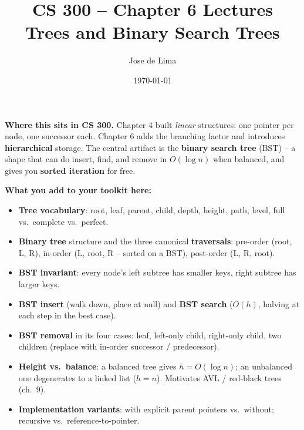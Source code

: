 \documentclass[11pt]{article}
\title{CS 300 -- Chapter 6 Lectures\\\large Trees and Binary Search Trees}
\author{Jose de Lima}
\date{\today}
\begin{document}
\maketitle

\begin{ideabox}
\textbf{Where this sits in CS 300.} Chapter 4 built \emph{linear}
structures: one pointer per node, one successor each. Chapter 6 adds the
branching factor and introduces \textbf{hierarchical} storage. The
central artifact is the \textbf{binary search tree} (BST) -- a shape
that can do insert, find, and remove in $O(\log n)$ when balanced, and
gives you \textbf{sorted iteration} for free.

\textbf{What you add to your toolkit here:}
\begin{itemize}
    \item \textbf{Tree vocabulary}: root, leaf, parent, child, depth,
          height, path, level, full vs.\ complete vs.\ perfect.
    \item \textbf{Binary tree} structure and the three canonical
          \textbf{traversals}: pre-order (root, L, R), in-order
          (L, root, R -- sorted on a BST), post-order (L, R, root).
    \item \textbf{BST invariant}: every node's left subtree has smaller
          keys, right subtree has larger keys.
    \item \textbf{BST insert} (walk down, place at null) and
          \textbf{BST search} ($O(h)$, halving at each step in the best
          case).
    \item \textbf{BST removal} in its four cases: leaf, left-only child,
          right-only child, two children (replace with in-order
          successor / predecessor).
    \item \textbf{Height vs.\ balance}: a balanced tree gives $h = O(\log
          n)$; an unbalanced one degenerates to a linked list ($h = n$).
          Motivates AVL / red-black trees (ch.~9).
    \item \textbf{Implementation variants}: with explicit parent
          pointers vs.\ without; recursive vs.\ reference-to-pointer.
\end{itemize}


\end{ideabox}
\end{document}
